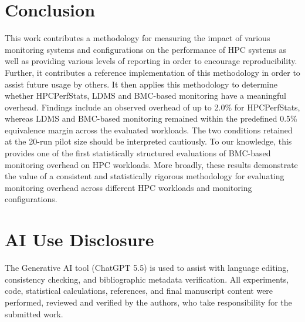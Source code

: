 \documentclass[conference]{IEEEtran}
\begin{document}
\section{Conclusion} \label{conclusion}

This work contributes a methodology for measuring the impact of various 
monitoring systems and configurations on the performance of HPC systems as well as providing 
various levels of reporting in order to encourage reproducibility. Further, it 
contributes a reference implementation of this methodology in order to assist 
future usage by others. It then 
applies this methodology to determine whether HPCPerfStats, LDMS and 
BMC-based monitoring have a meaningful overhead. Findings include an observed overhead of up to 2.0\% for HPCPerfStats, whereas
LDMS and BMC-based monitoring remained within the predefined 0.5\% equivalence margin
across the evaluated workloads. The two conditions retained at the 20-run pilot size should
be interpreted cautiously. To our knowledge, this provides one of the first statistically
structured evaluations of BMC-based monitoring overhead on HPC workloads.
More broadly, these results demonstrate the value of a consistent and statistically rigorous methodology for evaluating monitoring overhead across different HPC workloads and monitoring configurations.

\section*{AI Use Disclosure}
The Generative AI tool (ChatGPT 5.5) is used to assist with language editing,
consistency checking, and bibliographic metadata verification. All experiments, code, statistical calculations, references, and final manuscript content were performed, reviewed and verified by the authors, who take responsibility for the submitted work.


\end{document}
